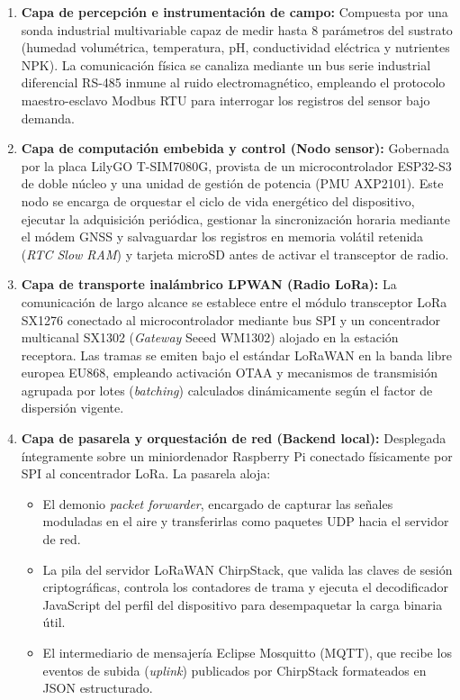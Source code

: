 \begin{enumerate}
    \item \textbf{Capa de percepción e instrumentación de campo:} Compuesta por una sonda industrial multivariable capaz de medir hasta 8 parámetros del sustrato (humedad volumétrica, temperatura, pH, conductividad eléctrica y nutrientes NPK). La comunicación física se canaliza mediante un bus serie industrial diferencial RS-485 inmune al ruido electromagnético, empleando el protocolo maestro-esclavo Modbus RTU para interrogar los registros del sensor bajo demanda.

    \item \textbf{Capa de computación embebida y control (Nodo sensor):} Gobernada por la placa LilyGO T-SIM7080G, provista de un microcontrolador ESP32-S3 de doble núcleo y una unidad de gestión de potencia (PMU AXP2101). Este nodo se encarga de orquestar el ciclo de vida energético del dispositivo, ejecutar la adquisición periódica, gestionar la sincronización horaria mediante el módem GNSS y salvaguardar los registros en memoria volátil retenida (\textit{RTC Slow RAM}) y tarjeta microSD antes de activar el transceptor de radio.

    \item \textbf{Capa de transporte inalámbrico LPWAN (Radio LoRa):} La comunicación de largo alcance se establece entre el módulo transceptor LoRa SX1276 conectado al microcontrolador mediante bus SPI y un concentrador multicanal SX1302 (\textit{Gateway} Seeed WM1302) alojado en la estación receptora. Las tramas se emiten bajo el estándar LoRaWAN en la banda libre europea EU868, empleando activación OTAA y mecanismos de transmisión agrupada por lotes (\textit{batching}) calculados dinámicamente según el factor de dispersión vigente.

    \item \textbf{Capa de pasarela y orquestación de red (Backend local):} Desplegada íntegramente sobre un miniordenador Raspberry Pi conectado físicamente por SPI al concentrador LoRa. La pasarela aloja:
    \begin{itemize}
        \item El demonio \textit{packet forwarder}, encargado de capturar las señales moduladas en el aire y transferirlas como paquetes UDP hacia el servidor de red.
        \item La pila del servidor LoRaWAN ChirpStack, que valida las claves de sesión criptográficas, controla los contadores de trama y ejecuta el decodificador JavaScript del perfil del dispositivo para desempaquetar la carga binaria útil.
        \item El intermediario de mensajería Eclipse Mosquitto (MQTT), que recibe los eventos de subida (\textit{uplink}) publicados por ChirpStack formateados en JSON estructurado.
    \end{itemize}


\end{enumerate}
